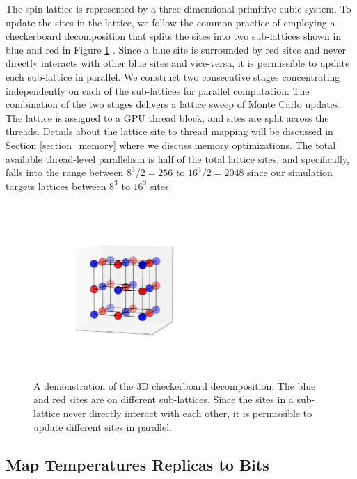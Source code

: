 The spin lattice is represented by a three dimensional primitive cubic system. To update the sites in 
the lattice, we follow the common practice of employing a checkerboard decomposition that 
splits the sites into two sub-lattices shown in blue and red in Figure \ref{fig_checkerboard} . 
Since a blue site is surrounded by red sites and never directly interacts with other 
blue sites and vice-versa, it is permissible to update each sub-lattice in parallel.  
We construct two consecutive stages concentrating 
independently on each of the sub-lattices for parallel computation. The combination of 
the two stages delivers a lattice sweep of Monte Carlo updates. The lattice is assigned 
to a GPU thread block, and sites are split across the threads. Details about the 
lattice site to thread mapping will be discussed in Section \ref{section_memory} 
where we discuss memory optimizations. The total available thread-level parallelism 
is half of the total lattice sites, and specifically, falls into the range between 
$8^3 / 2 = 256$ to $16^3 / 2 = 2048$ since our simulation targets lattices 
between $8^3$ to $16^3$ sites. 


\begin{figure}[ht]
  \centering
  \includegraphics[width=0.6\textwidth] {img/checkerboard.pdf} 
  \caption{A demonstration of the 3D checkerboard decomposition. 
The blue and red sites are on different sub-lattices. 
Since the sites in a sub-lattice never directly interact with each other, 
it is permissible to update different sites in parallel. 
}

\label{fig_checkerboard}
  \end{figure}


\subsection{Map Temperatures Replicas to Bits} 

